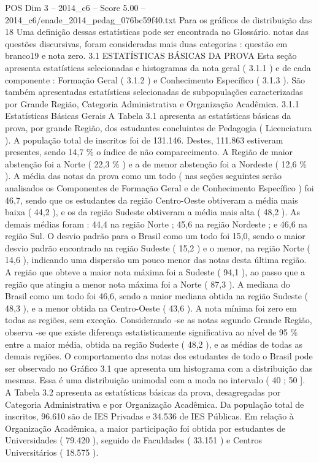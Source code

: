 \begin{textsample}{POS Dim 3 – 2014\_c6 – Score 5.00 – 2014\_c6/enade\_2014\_pedag\_076bc59f40.txt}
Para os gráficos de distribuição das 18 Uma definição dessas estatísticas pode ser encontrada no Glossário. notas das questões discursivas, foram consideradas mais duas categorias : questão em branco19 e nota zero. 3.1 ESTATÍSTICAS BÁSICAS DA PROVA Esta seção apresenta estatísticas selecionadas e histogramas da nota geral ( 3.1.1 ) e de cada componente : Formação Geral ( 3.1.2 ) e Conhecimento Específico ( 3.1.3 ).
São também apresentadas estatísticas selecionadas de subpopulações caracterizadas por Grande Região, Categoria Administrativa e Organização Acadêmica. 3.1.1 Estatísticas Básicas Gerais A Tabela 3.1 apresenta as estatísticas básicas da prova, por grande Região, dos estudantes concluintes de Pedagogia ( Licenciatura ).
A população total de inscritos foi de 131.146.
Destes, 111.863 estiveram presentes, sendo 14,7 \% o índice de não comparecimento.
A Região de maior abstenção foi a Norte ( 22,3 \% ) e a de menor abstenção foi a Nordeste ( 12,6 \% ).
A média das notas da prova como um todo ( nas seções seguintes serão analisados os Componentes de Formação Geral e de Conhecimento Específico ) foi 46,7, sendo que os estudantes da região Centro-Oeste obtiveram a média mais baixa ( 44,2 ), e os da região Sudeste obtiveram a média mais alta ( 48,2 ).
As demais médias foram : 44,4 na região Norte ; 45,6 na região Nordeste ; e 46,6 na região Sul.
O desvio padrão para o Brasil como um todo foi 15,0, sendo o maior desvio padrão encontrado na região Sudeste ( 15,2 ) e o menor, na região Norte ( 14,6 ), indicando uma dispersão um pouco menor das notas desta última região.
A região que obteve a maior nota máxima foi a Sudeste ( 94,1 ), ao passo que a região que atingiu a menor nota máxima foi a Norte ( 87,3 ).
A mediana do Brasil como um todo foi 46,6, sendo a maior mediana obtida na região Sudeste ( 48,3 ), e a menor obtida na Centro-Oeste ( 43,6 ).
A nota mínima foi zero em todas as regiões, sem exceção.
Considerando -se as notas segundo Grande Região, observa -se que existe diferença estatisticamente significativa ao nível de 95 \% entre a maior média, obtida na região Sudeste ( 48,2 ), e as médias de todas as demais regiões.
O comportamento das notas dos estudantes de todo o Brasil pode ser observado no Gráfico 3.1 que apresenta um histograma com a distribuição das mesmas.
Essa é uma distribuição unimodal com a moda no intervalo ( 40 ; 50 ].
A Tabela 3.2 apresenta as estatísticas básicas da prova, desagregadas por Categoria Administrativa e por Organização Acadêmica.
Da população total de inscritos, 96.610 são de IES Privadas e 34.536 de IES Públicas.
Em relação à Organização Acadêmica, a maior participação foi obtida por estudantes de Universidades ( 79.420 ), seguido de Faculdades ( 33.151 ) e Centros Universitários ( 18.575 ).

\end{textsample}
